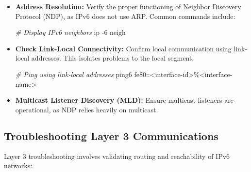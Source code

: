 \documentclass[
]{article}
\newenvironment{Shaded}{}{}
\newcommand{\AttributeTok}[1]{\textcolor[rgb]{0.49,0.56,0.16}{#1}}
\newcommand{\CommentTok}[1]{\textcolor[rgb]{0.38,0.63,0.69}{\textit{#1}}}
\newcommand{\ExtensionTok}[1]{#1}
\newcommand{\NormalTok}[1]{#1}
\newcommand{\OperatorTok}[1]{\textcolor[rgb]{0.40,0.40,0.40}{#1}}
\begin{document}
\begin{itemize}
\item
  \textbf{Address Resolution:} Verify the proper functioning of Neighbor
  Discovery Protocol (NDP), as IPv6 does not use ARP. Common commands
  include:

\begin{Shaded}
\begin{Highlighting}[]
\CommentTok{\# Display IPv6 neighbors}
\ExtensionTok{ip} \AttributeTok{{-}6}\NormalTok{ neigh}
\end{Highlighting}
\end{Shaded}
\item
  \textbf{Check Link-Local Connectivity:} Confirm local communication
  using link-local addresses. This isolates problems to the local
  segment.

\begin{Shaded}
\begin{Highlighting}[]
\CommentTok{\# Ping using link{-}local addresses}
\ExtensionTok{ping6}\NormalTok{ fe80::}\OperatorTok{\textless{}}\NormalTok{interface{-}id}\OperatorTok{\textgreater{}}\NormalTok{\%}\OperatorTok{\textless{}}\NormalTok{interface{-}name}\OperatorTok{\textgreater{}}
\end{Highlighting}
\end{Shaded}
\item
  \textbf{Multicast Listener Discovery (MLD):} Ensure multicast
  listeners are operational, as NDP relies heavily on multicast.
\end{itemize}

\subsection{Troubleshooting Layer 3
Communications}\label{troubleshooting-layer-3-communications}

Layer 3 troubleshooting involves validating routing and reachability of
IPv6 networks:
\end{document}
